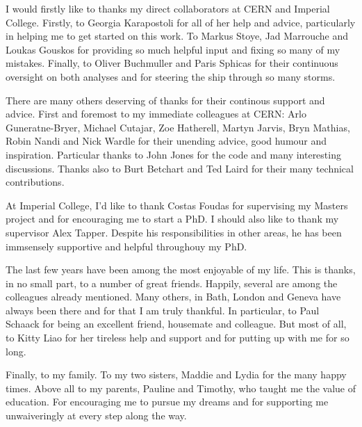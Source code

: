 \begin{acknowledgements}
  I would firstly like to thanks my direct collaborators at \ac{CERN} and
  Imperial College. Firstly, to Georgia Karapostoli for all of her help and
  advice, particularly in helping me to get started on this work. To Markus
  Stoye, Jad Marrouche and Loukas Gouskos for providing so much helpful input
  and fixing so many of my mistakes. Finally, to Oliver Buchmuller and Paris
  Sphicas for their continuous oversight on both analyses and for steering the
  ship through so many storms.

  There are many others deserving of thanks for their continous support and
  advice. First and foremost to my immediate colleagues at \ac{CERN}: Arlo
  Guneratne-Bryer, Michael Cutajar, Zoe Hatherell, Martyn Jarvis, Bryn Mathias,
  Robin Nandi and Nick Wardle for their unending advice, good humour and
  inspiration. Particular thanks to John Jones for the  code and many
  interesting discussions. Thanks also to Burt Betchart and Ted Laird for their
  many technical contributions.

  At Imperial College, I'd like to thank Costas Foudas for supervising my
  Masters project and for encouraging me to start a PhD.  I should also like to
  thank my supervisor Alex Tapper. Despite his responsibilities in other areas,
  he has been immsensely supportive and helpful throughouy my PhD.

  The last few years have been among the most enjoyable of my life. This is
  thanks, in no small part, to a number of great friends. Happily, several are
  among the colleagues already mentioned. Many others, in Bath, London and
  Geneva have always been there and for that I am truly thankful. In particular,
  to Paul Schaack for being an excellent friend, housemate and colleague. But
  most of all, to Kitty Liao for her tireless help and support and for putting
  up with me for so long.

  Finally, to my family.  To my two sisters, Maddie and Lydia for the many happy
  times. Above all to my parents, Pauline and Timothy, who taught me the value
  of education. For encouraging me to pursue my dreams and for supporting me
  unwaiveringly at every step along the way.
\end{acknowledgements}




\tableofcontents

\listoffigures
\listoftables


